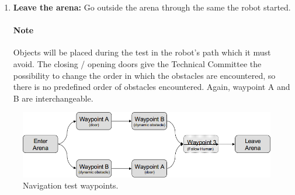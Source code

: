 \begin{enumerate}
\item \textbf{Leave the arena:} Go outside the arena through the same the robot started.

\paragraph{Note} Objects will be placed during the test in the robot's path which it must avoid. The closing / opening doors give the Technical Committee the possibility to change the order in which the obstacles are encountered, so there is no predefined order of obstacles encountered. Again, waypoint A and B are interchangeable.
\end{enumerate}

\begin{figure}[tbp]
	\centering
	\includegraphics[width=0.75\columnwidth]{images/navigation.png}
	\caption{Navigation test waypoints.}
	\label{fig:navigation}
\end{figure}

